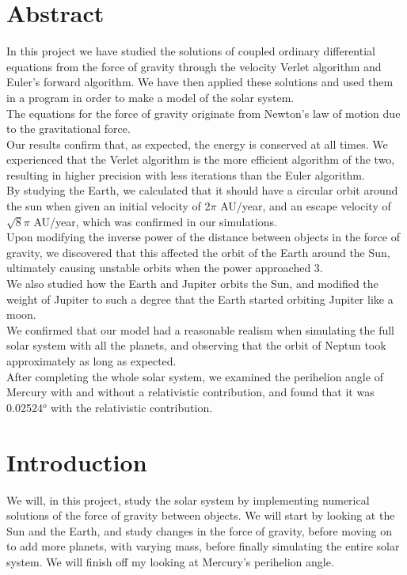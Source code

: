 \documentclass{article}
\begin{document}
\section*{Abstract}
    In this project we have studied the solutions of coupled ordinary differential equations from the force of gravity through the velocity Verlet algorithm and Euler's forward algorithm. We have then applied these solutions and used them in a program in order to make a model of the solar system.\\
    The equations for the force of gravity originate from Newton's law of motion due to the gravitational force.\\
    Our results confirm that, as expected, the energy is conserved at all times. We experienced that the Verlet algorithm is the more efficient algorithm of the two, resulting in higher precision with less iterations than the Euler algorithm.\\
    By studying the Earth, we calculated that it should have a circular orbit around the sun when given an initial velocity of 2$\pi$ AU/year, and an escape velocity of $\sqrt{8}\pi$ AU/year, which was confirmed in our simulations.\\
    Upon modifying the inverse power of the distance between objects in the force of gravity, we discovered that this affected the orbit of the Earth around the Sun, ultimately causing unstable orbits when the power approached 3.\\
    We also studied how the Earth and Jupiter orbits the Sun, and modified the weight of Jupiter to such a degree that the Earth started orbiting Jupiter like a moon.\\
    We confirmed that our model had a reasonable realism when simulating the full solar system with all the planets, and observing that the orbit of Neptun took approximately as long as expected.\\
    After completing the whole solar system, we examined the perihelion angle of Mercury with and without a relativistic contribution, and found that it was 0.02524$^o$ with the relativistic contribution.

\newpage

\tableofcontents

\newpage

\section{Introduction}
    We will, in this project, study the solar system by implementing numerical solutions of the force of gravity between objects. We will start by looking at the Sun and the Earth, and study changes in the force of gravity, before moving on to add more planets, with varying mass, before finally simulating the entire solar system. We will finish off my looking at Mercury's perihelion angle.
\end{document}

